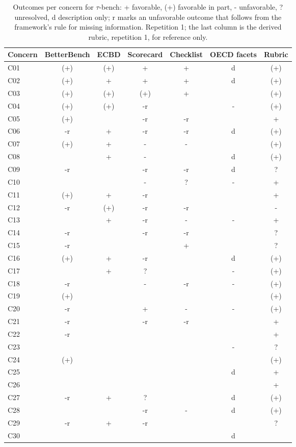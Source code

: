 \begin{table}[t]
\caption{Outcomes per concern for $\tau$-bench: + favorable, (+) favorable in part, - unfavorable, ? unresolved, d description only; r marks an unfavorable outcome that follows from the framework's rule for missing information. Repetition 1; the last column is the derived rubric, repetition 1, for reference only.}
\label{tab:grid-tau-bench}
\small\centering\begin{tabular}{lcccccc}\toprule
Concern & BetterBench & ECBD & Scorecard & Checklist & OECD facets & Rubric \\
\midrule
C01 & (+) & (+) & + & + & d & (+) \\
C02 & (+) & + & + & + & d & (+) \\
C03 & (+) & (+) & (+) & + &  & (+) \\
C04 & (+) & (+) & -r &  & - & (+) \\
C05 & (+) &  & -r & -r &  & + \\
C06 & -r & + & -r & -r & d & (+) \\
C07 & (+) & + & - & - &  & (+) \\
C08 &  & + & - &  & d & (+) \\
C09 & -r &  & -r & -r & d & ? \\
C10 &  &  & - & ? & - & + \\
C11 & (+) & + & -r &  &  & + \\
C12 & -r & (+) & -r & -r &  & - \\
C13 &  & + & -r & - & - & + \\
C14 & -r &  & -r & -r &  & ? \\
C15 & -r &  &  & + &  & ? \\
C16 & (+) & + & -r &  & d & (+) \\
C17 &  & + & ? &  & - & (+) \\
C18 & -r &  & - & -r & - & (+) \\
C19 & (+) &  &  &  &  & (+) \\
C20 & -r &  & + & - & - & (+) \\
C21 & -r &  & -r & -r &  & + \\
C22 & -r &  &  &  &  & + \\
C23 &  &  &  &  & - & ? \\
C24 & (+) &  &  &  &  & (+) \\
C25 &  &  &  &  & d & + \\
C26 &  &  &  &  &  & + \\
C27 & -r & + & ? &  & d & (+) \\
C28 &  &  & -r & - & d & (+) \\
C29 & -r & + & -r &  &  & ? \\
C30 &  &  &  &  & d &  \\
\bottomrule\end{tabular}
\end{table}
